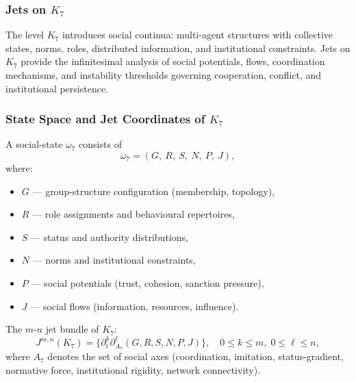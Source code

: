 
\subsubsection{Jets on \texorpdfstring{$K_7$}{K_7}}
\label{sec:jets-k7}

The level $K_7$ introduces social continua: multi-agent structures with
collective states, norms, roles, distributed information, and
institutional constraints. Jets on $K_7$ provide the infinitesimal
analysis of social potentials, flows, coordination mechanisms, and
instability thresholds governing cooperation, conflict, and institutional
persistence.


\subsubsection{State Space and Jet Coordinates of \texorpdfstring{$K_7$}{K_7}}

A social-state $\omega_7$ consists of
\[
\omega_7 =
(G,\ R,\ S,\ N,\ P,\ J),
\]
where:
\begin{itemize}
    \item $G$ — group-structure configuration (membership, topology),
    \item $R$ — role assignments and behavioural repertoires,
    \item $S$ — status and authority distributions,
    \item $N$ — norms and institutional constraints,
    \item $P$ — social potentials (trust, cohesion, sanction pressure),
    \item $J$ — social flows (information, resources, influence).
\end{itemize}

The $m$-$n$ jet bundle of $K_7$:
\[
J^{m,n}(K_7)
=
\big\{
\partial_t^k \partial_{A_7}^\ell (G,R,S,N,P,J)
\big\},
\quad
0\le k\le m,\; 0\le\ell\le n,
\]
where $A_7$ denotes the set of social axes (coordination, imitation,
status-gradient, normative force, institutional rigidity, network
connectivity).


